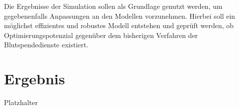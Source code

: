 Die Ergebnisse der Simulation sollen als Grundlage genutzt werden, um gegebenenfalls Anpassungen an den Modellen vorzunehmen.
Hierbei soll ein möglichst effizientes und robustes Modell entstehen und geprüft werden, ob Optimierungspotenzial gegenüber dem bisherigen Verfahren der Blutspendedienste existiert.

\section{Ergebnis}
Platzhalter
